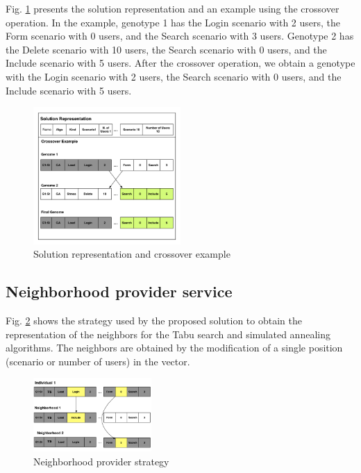 \documentclass[times]{stvrauth}
\begin{document}
Fig. \ref{fig:genomarepresentation} presents the solution representation and an example using the crossover operation. In the example, genotype 1 has the Login scenario with 2 users, the Form scenario with 0 users, and the Search scenario with 3 users. Genotype 2 has the Delete scenario with 10 users, the Search scenario with 0 users, and the Include scenario with 5 users. After the crossover operation, we obtain a genotype with the Login scenario with 2 users, the Search scenario with 0 users, and the Include scenario with 5 users.

\begin{figure}[h]
\centering
\includegraphics[width=0.5\textwidth]{./images/genomerepresentation1.png}
\caption{Solution representation and crossover example}
\label{fig:genomarepresentation}
\end{figure}


\subsection{Neighborhood provider service}


Fig. \ref{fig:neighbourtaby} shows the strategy used by the proposed solution to obtain the representation of the neighbors for the Tabu search and simulated annealing algorithms. The neighbors are obtained by the modification of a single position (scenario or number of users) in the vector.


\begin{figure}[h]
\centering
\includegraphics[width=0.4\textwidth]{./images/neighbor.png}
\caption{Neighborhood provider strategy}
\label{fig:neighbourtaby}
\end{figure}
\end{document}
